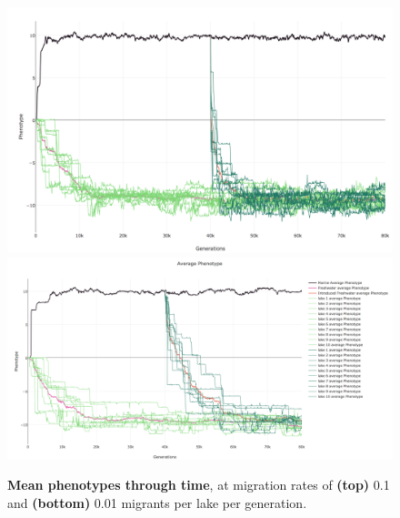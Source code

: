 \documentclass{article}
\begin{document}
\begin{figure}
	\begin{center}
        \includegraphics[width=1.0\linewidth]{plotlyPlots/PhenotypeThroughout5e-4.png}
        \includegraphics[width=1.0\linewidth]{plotlyPlots/PhenotypeThroughout5e-5.png}
  		\caption{
            \textbf{Mean phenotypes through time},
            at migration rates of
            \textbf{(top)} 0.1 and
            \textbf{(bottom)} 0.01 migrants per lake per generation.
		}
  		\label{fig:pheno_by_time2}
	\end{center}
\end{figure}
\end{document}
